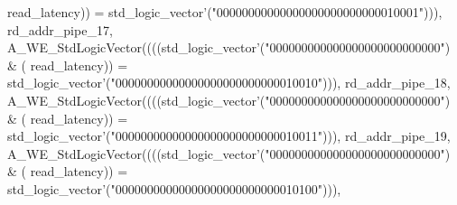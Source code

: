 \begin{DoxyCode}
{      read_latency}\textcolor{vhdlchar}{)}\textcolor{vhdlchar}{)} \textcolor{vhdlchar}{=} \textcolor{comment}{std\_logic\_vector}\textcolor{vhdlchar}{'}\textcolor{vhdlchar}{(}\textcolor{vhdllogic}{"00000000000000000000000000010001"}\textcolor{vhdlchar}{)}\textcolor{vhdlchar}{)}\textcolor{vhdlchar}{)}\textcolor{vhdlchar}{,} \textcolor{vhdlchar}{
      rd_addr_pipe_17}\textcolor{vhdlchar}{,} \textcolor{vhdlchar}{A\_WE\_StdLogicVector}\textcolor{vhdlchar}{(}\textcolor{vhdlchar}{(}\textcolor{vhdlchar}{(}\textcolor{vhdlchar}{(}\textcolor{comment}{std\_logic\_vector}\textcolor{vhdlchar}{'}\textcolor{vhdlchar}{(}\textcolor{vhdllogic}{"000000000000000000000000000"}\textcolor{vhdlchar}{)} \textcolor{vhdlchar}{&} \textcolor{vhdlchar}{(}\textcolor{vhdlchar}{
      read_latency}\textcolor{vhdlchar}{)}\textcolor{vhdlchar}{)} \textcolor{vhdlchar}{=} \textcolor{comment}{std\_logic\_vector}\textcolor{vhdlchar}{'}\textcolor{vhdlchar}{(}\textcolor{vhdllogic}{"00000000000000000000000000010010"}\textcolor{vhdlchar}{)}\textcolor{vhdlchar}{)}\textcolor{vhdlchar}{)}\textcolor{vhdlchar}{,} \textcolor{vhdlchar}{
      rd_addr_pipe_18}\textcolor{vhdlchar}{,} \textcolor{vhdlchar}{A\_WE\_StdLogicVector}\textcolor{vhdlchar}{(}\textcolor{vhdlchar}{(}\textcolor{vhdlchar}{(}\textcolor{vhdlchar}{(}\textcolor{comment}{std\_logic\_vector}\textcolor{vhdlchar}{'}\textcolor{vhdlchar}{(}\textcolor{vhdllogic}{"000000000000000000000000000"}\textcolor{vhdlchar}{)} \textcolor{vhdlchar}{&} \textcolor{vhdlchar}{(}\textcolor{vhdlchar}{
      read_latency}\textcolor{vhdlchar}{)}\textcolor{vhdlchar}{)} \textcolor{vhdlchar}{=} \textcolor{comment}{std\_logic\_vector}\textcolor{vhdlchar}{'}\textcolor{vhdlchar}{(}\textcolor{vhdllogic}{"00000000000000000000000000010011"}\textcolor{vhdlchar}{)}\textcolor{vhdlchar}{)}\textcolor{vhdlchar}{)}\textcolor{vhdlchar}{,} \textcolor{vhdlchar}{
      rd_addr_pipe_19}\textcolor{vhdlchar}{,} \textcolor{vhdlchar}{A\_WE\_StdLogicVector}\textcolor{vhdlchar}{(}\textcolor{vhdlchar}{(}\textcolor{vhdlchar}{(}\textcolor{vhdlchar}{(}\textcolor{comment}{std\_logic\_vector}\textcolor{vhdlchar}{'}\textcolor{vhdlchar}{(}\textcolor{vhdllogic}{"000000000000000000000000000"}\textcolor{vhdlchar}{)} \textcolor{vhdlchar}{&} \textcolor{vhdlchar}{(}\textcolor{vhdlchar}{
      read_latency}\textcolor{vhdlchar}{)}\textcolor{vhdlchar}{)} \textcolor{vhdlchar}{=} \textcolor{comment}{std\_logic\_vector}\textcolor{vhdlchar}{'}\textcolor{vhdlchar}{(}\textcolor{vhdllogic}{"00000000000000000000000000010100"}\textcolor{vhdlchar}{)}\textcolor{vhdlchar}{)}\textcolor{vhdlchar}{)}\textcolor{vhdlchar}{,} \textcolor{vhdlchar}{
}
\end{DoxyCode}
